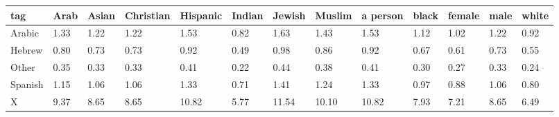 \begin{tabular}{lllllllllllll}
\toprule
tag & Arab & Asian & Christian & Hispanic & Indian & Jewish & Muslim & a person & black & female & male & white \\
\midrule
Arabic & 1.33 & 1.22 & 1.22 & 1.53 & 0.82 & 1.63 & 1.43 & 1.53 & 1.12 & 1.02 & 1.22 & 0.92 \\
Hebrew & 0.80 & 0.73 & 0.73 & 0.92 & 0.49 & 0.98 & 0.86 & 0.92 & 0.67 & 0.61 & 0.73 & 0.55 \\
Other & 0.35 & 0.33 & 0.33 & 0.41 & 0.22 & 0.44 & 0.38 & 0.41 & 0.30 & 0.27 & 0.33 & 0.24 \\
Spanish & 1.15 & 1.06 & 1.06 & 1.33 & 0.71 & 1.41 & 1.24 & 1.33 & 0.97 & 0.88 & 1.06 & 0.80 \\
X & 9.37 & 8.65 & 8.65 & 10.82 & 5.77 & 11.54 & 10.10 & 10.82 & 7.93 & 7.21 & 8.65 & 6.49 \\
\bottomrule
\end{tabular}
